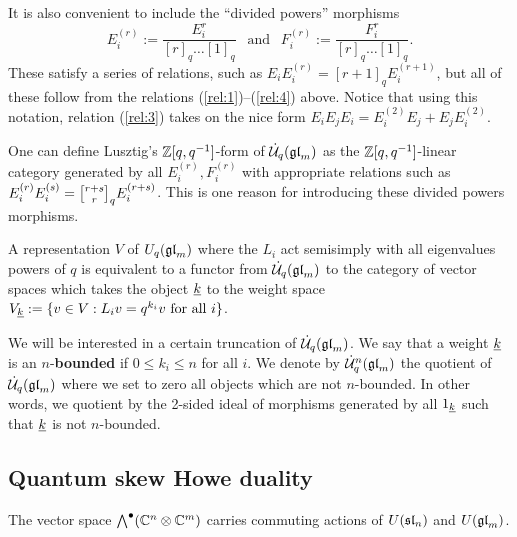 \documentclass[11pt]{amsart}
\begin{document}
It is also convenient to include the ``divided powers'' morphisms
$$E_i^{(r)} := \frac{E_i^r}{[r]_q \dots [1]_q} \ \ \text{ and } \ \ F_i^{(r)} := \frac{F_i^r}{[r]_q \dots [1]_q}.$$
These satisfy a series of relations, such as $E_i E_i^{(r)} = [r+1]_q E_i^{(r+1)}$, but all of these follow from the relations (\ref{rel:1})--(\ref{rel:4}) above. Notice that using this notation, relation (\ref{rel:3}) takes on the nice form $E_iE_jE_i = E_i^{(2)}E_j + E_jE_i^{(2)}$.

\begin{rem}
One can define Lusztig's $\bZ[q, q^{-1}]$-form of $ \dU(\gl_m) $ as the $ \bZ[q,q^{-1}]$-linear category generated by all $ E_i^{(r)}, F_i^{(r)} $ with appropriate relations such as $ E_i^{(r)} E_i^{(s)} = \qBinomial{r+s}{r} E_i^{(r+s)}$.   This is one reason for introducing these divided powers morphisms.
\end{rem}

A representation $ V $ of $ U_q(\gl_m) $ where the $ L_i $ act semisimply with all eigenvalues powers of $ q $ is equivalent to a functor from $ \dU(\gl_m) $ to the category of vector spaces which takes the object $ \ul{k} $ to the weight space $ V_{\ul{k}} := \{ v \in V : L_i v = q^{k_i} v \text{ for all } i \} $. 

We will be interested in a certain truncation of $ \dU(\gl_m) $.  We say that a weight $ \ul{k} $ is an $n$-\textbf{bounded} if $ 0 \le k_i \le n $ for all $ i$.  We denote by $\dU^n(\gl_m)$ the quotient of $\dU(\gl_m)$ where we set to zero all objects which are not $n$-bounded. In other words, we quotient by the 2-sided ideal of morphisms generated by all $ \one_{\ul{k}} $ such that $ \ul{k} $ is not $ n$-bounded.

\subsection{Quantum skew Howe duality}\label{sec:quantumskew}

The vector space $\Alt{\bullet}{}(\mathbb C^n \otimes \mathbb C^m)$ carries commuting actions of $U(\sl_n)$ and $U(\gl_m)$. 
\end{document}
